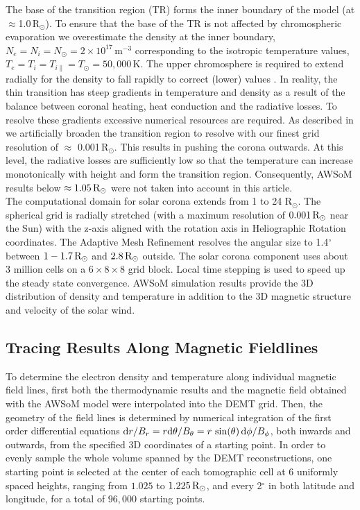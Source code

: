 \documentclass[namedreferences]{solarphysics}
\newcommand{\rsun}{R{$_\odot$}}
\newcommand{\mrsun}{{\rm R_\odot}}
\begin{document}
\begin{article}
The base of the transition region (TR) forms the inner boundary of the model (at $\approx$1.0\,\rsun). To ensure that the base of the TR is not affected by chromospheric evaporation we overestimate the density at the inner boundary, $N_{e}=N_{i}=N_{\odot}=2\times10^{17}$\,m$^{-3}$ corresponding to the isotropic temperature values, $T_{e}=T_{i}=T_{i\parallel}=T_{\odot}=50,000$\,K. The upper chromosphere is required to extend radially for the density to fall rapidly to correct (lower) values \citep{Lio2009}. In reality, the thin transition has steep gradients in temperature and density as a result of the balance between coronal heating, heat conduction and the radiative losses. To resolve these gradients excessive numerical resources are required. As described in \citet{Lio2009,Sok2013} we artificially broaden the transition region to resolve with our finest grid resolution of $\approx$ 0.001\,\rsun. This results in pushing the corona outwards. At this level, the radiative losses are sufficiently low so that the temperature can increase monotonically with height and form the transition region. Consequently, AWSoM results below {$\approx 1.05\,\mrsun$} were not taken into account in this article.
\\
The computational domain for solar corona extends from 1 to 24 R$_{\odot}$. The spherical grid is radially stretched (with a maximum resolution of $0.001 \, \mrsun$ near the Sun) with the z-axis aligned with the rotation axis in Heliographic Rotation coordinates. The Adaptive Mesh Refinement resolves the angular size to 1.4$^\circ$ between $1 - 1.7 \, \mrsun$ and $2.8 \, \mrsun$ outside. The solar corona component uses about 3 million cells on a $6 \times 8 \times 8$ grid block. Local time stepping is used to speed up the steady state convergence. AWSoM simulation results provide the 3D distribution of density and temperature in addition to the 3D magnetic structure and velocity of the solar wind. 

\subsection{{Tracing Results Along Magnetic Fieldlines}}\label{trace} 

{To determine} the electron density and temperature along individual magnetic field lines, first both the thermodynamic results and the magnetic field obtained with the AWSoM model were interpolated into the DEMT grid. Then, the geometry of the field lines is determined by numerical integration of the first order differential equations  ${\rm d}r/B_r = r{\rm d}\theta/B_\theta = r\,\sin(\theta)\,{\rm d}\phi/B_\phi$, both inwards and outwards, from the specified 3D coordinates of a starting point. In order to evenly sample the whole volume spanned by the DEMT reconstructions, one starting point is selected at the center of each tomographic cell at 6 uniformly spaced heights, ranging from $1.025$ to $1.225\,\mrsun$, and every 2$^\circ$ in both latitude and longitude, for a total of $96,000$ starting points. 


\end{article}
\end{document}
